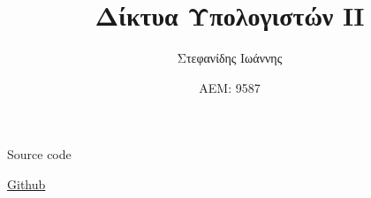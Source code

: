 \documentclass{article}
\author{Στεφανίδης Ιωάννης}
\title{Δίκτυα Υπολογιστών ΙΙ}
\date{ΑΕΜ: 9587}
\begin{document}
\maketitle

\begin{center}
  \huge Source code
\end{center}

\begin{center}
  \href{https://github.com/johnstef99/networks_2}{Github}
\end{center}

\inputminted{java}{../../code/userApplication.java}
\end{document}

